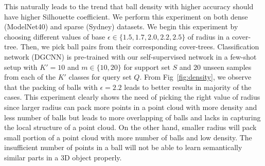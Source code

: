 \documentclass{article}
\begin{document}
 This naturally leads to the trend that ball density with higher accuracy should have higher Silhouette coefficient. We perform this experiment on both dense (ModelNet40) and sparse (Sydney) datasets. We begin this experiment by choosing different values of base $\epsilon \in \{1.5,1.7,2.0,2.2,2.5\}$ of radius in a cover-tree. Then, we pick ball pairs from their corresponding cover-trees. Classification network (DGCNN) is pre-trained with our self-supervised network in a few-shot setup with $K'=10$ and $m \in \{10,20\}$ for support set $S$ and $20$ unseen samples from each of the $K'$ classes for query set $Q$. From Fig~\ref{fig:density}, we observe that the packing of balls with $\epsilon=2.2$ leads to better results in majority of the cases. This experiment clearly shows the need of picking the right value of radius since larger radius can pack more points in a point cloud with more density and less number of balls but leads to more overlapping of balls and lacks in capturing the local structure of a point cloud. On the other hand, smaller radius will pack small portion of a point cloud with more number of balls and low density. The insufficient number of points in a ball will not be able to learn  semantically similar parts in a 3D object properly.
\fi
\end{document}
